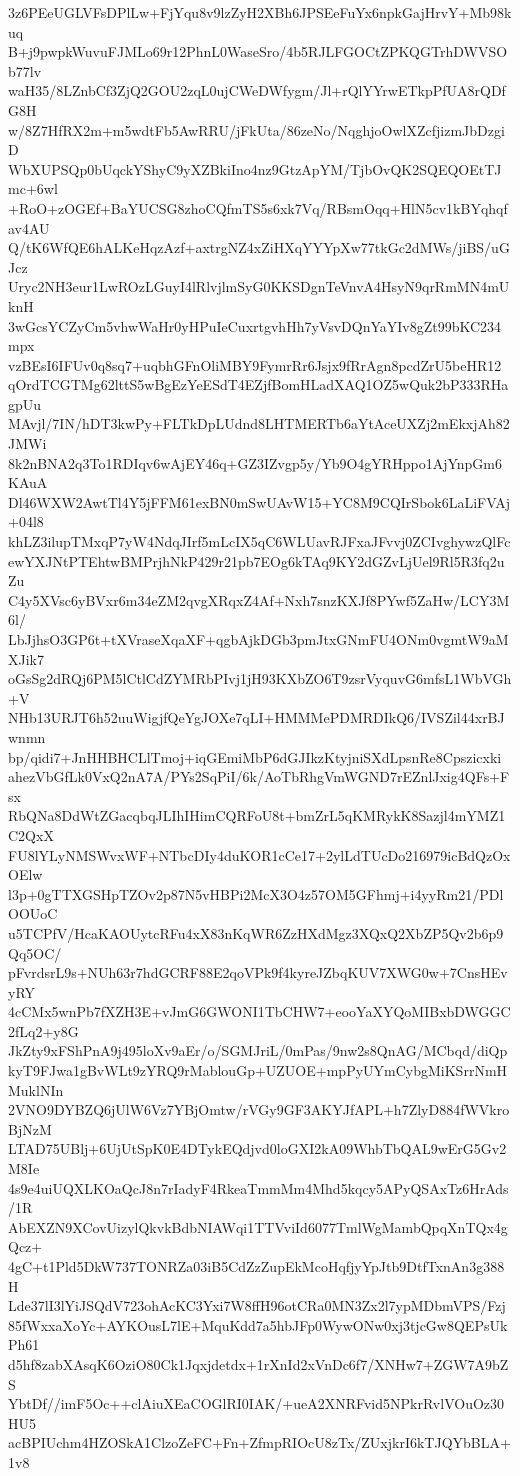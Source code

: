 3z6PEeUGLVFsDPlLw+FjYqu8v9lzZyH2XBh6JPSEeFuYx6npkGajHrvY+Mb98kuq
B+j9pwpkWuvuFJMLo69r12PhnL0WaseSro/4b5RJLFGOCtZPKQGTrhDWVSOb77lv
waH35/8LZnbCf3ZjQ2GOU2zqL0ujCWeDWfygm/Jl+rQlYYrwETkpPfUA8rQDfG8H
w/8Z7HfRX2m+m5wdtFb5AwRRU/jFkUta/86zeNo/NqghjoOwlXZcfjizmJbDzgiD
WbXUPSQp0bUqckYShyC9yXZBkiIno4nz9GtzApYM/TjbOvQK2SQEQOEtTJmc+6wl
+RoO+zOGEf+BaYUCSG8zhoCQfmTS5s6xk7Vq/RBsmOqq+HlN5cv1kBYqhqfav4AU
Q/tK6WfQE6hALKeHqzAzf+axtrgNZ4xZiHXqYYYpXw77tkGc2dMWs/jiBS/uGJcz
Uryc2NH3eur1LwROzLGuyI4lRlvjlmSyG0KKSDgnTeVnvA4HsyN9qrRmMN4mUknH
3wGcsYCZyCm5vhwWaHr0yHPuIeCuxrtgvhHh7yVsvDQnYaYIv8gZt99bKC234mpx
vzBEsI6IFUv0q8sq7+uqbhGFnOliMBY9FymrRr6Jsjx9fRrAgn8pcdZrU5beHR12
qOrdTCGTMg62lttS5wBgEzYeESdT4EZjfBomHLadXAQ1OZ5wQuk2bP333RHagpUu
MAvjl/7IN/hDT3kwPy+FLTkDpLUdnd8LHTMERTb6aYtAceUXZj2mEkxjAh82JMWi
8k2nBNA2q3To1RDIqv6wAjEY46q+GZ3IZvgp5y/Yb9O4gYRHppo1AjYnpGm6KAuA
Dl46WXW2AwtTl4Y5jFFM61exBN0mSwUAvW15+YC8M9CQIrSbok6LaLiFVAj+04l8
khLZ3ilupTMxqP7yW4NdqJIrf5mLcIX5qC6WLUavRJFxaJFvvj0ZCIvghywzQlFc
ewYXJNtPTEhtwBMPrjhNkP429r21pb7EOg6kTAq9KY2dGZvLjUel9Rl5R3fq2uZu
C4y5XVsc6yBVxr6m34eZM2qvgXRqxZ4Af+Nxh7snzKXJf8PYwf5ZaHw/LCY3M6l/
LbJjhsO3GP6t+tXVraseXqaXF+qgbAjkDGb3pmJtxGNmFU4ONm0vgmtW9aMXJik7
oGsSg2dRQj6PM5lCtlCdZYMRbPIvj1jH93KXbZO6T9zsrVyquvG6mfsL1WbVGh+V
NHb13URJT6h52uuWigjfQeYgJOXe7qLI+HMMMePDMRDIkQ6/IVSZil44xrBJwnmn
bp/qidi7+JnHHBHCLlTmoj+iqGEmiMbP6dGJIkzKtyjniSXdLpsnRe8Cpszicxki
ahezVbGfLk0VxQ2nA7A/PYs2SqPiI/6k/AoTbRhgVmWGND7rEZnlJxig4QFs+Fsx
RbQNa8DdWtZGacqbqJLIhIHimCQRFoU8t+bmZrL5qKMRykK8Sazjl4mYMZ1C2QxX
FU8lYLyNMSWvxWF+NTbcDIy4duKOR1cCe17+2ylLdTUcDo216979icBdQzOxOElw
l3p+0gTTXGSHpTZOv2p87N5vHBPi2McX3O4z57OM5GFhmj+i4yyRm21/PDlOOUoC
u5TCPfV/HcaKAOUytcRFu4xX83nKqWR6ZzHXdMgz3XQxQ2XbZP5Qv2b6p9Qq5OC/
pFvrdsrL9s+NUh63r7hdGCRF88E2qoVPk9f4kyreJZbqKUV7XWG0w+7CnsHEvyRY
4cCMx5wnPb7fXZH3E+vJmG6GWONI1TbCHW7+eooYaXYQoMIBxbDWGGC2fLq2+y8G
JkZty9xFShPnA9j495loXv9aEr/o/SGMJriL/0mPas/9nw2s8QnAG/MCbqd/diQp
kyT9FJwa1gBvWLt9zYRQ9rMablouGp+UZUOE+mpPyUYmCybgMiKSrrNmHMuklNIn
2VNO9DYBZQ6jUlW6Vz7YBjOmtw/rVGy9GF3AKYJfAPL+h7ZlyD884fWVkroBjNzM
LTAD75UBlj+6UjUtSpK0E4DTykEQdjvd0loGXI2kA09WhbTbQAL9wErG5Gv2M8Ie
4s9e4uiUQXLKOaQcJ8n7rIadyF4RkeaTmmMm4Mhd5kqcy5APyQSAxTz6HrAds/1R
AbEXZN9XCovUizylQkvkBdbNIAWqi1TTVviId6077TmlWgMambQpqXnTQx4gQcz+
4gC+t1Pld5DkW737TONRZa03iB5CdZzZupEkMcoHqfjyYpJtb9DtfTxnAn3g388H
Lde37lI3lYiJSQdV723ohAcKC3Yxi7W8ffH96otCRa0MN3Zx2l7ypMDbmVPS/Fzj
85fWxxaXoYc+AYKOusL7lE+MquKdd7a5hbJFp0WywONw0xj3tjcGw8QEPsUkPh61
d5hf8zabXAsqK6OziO80Ck1Jqxjdetdx+1rXnId2xVnDc6f7/XNHw7+ZGW7A9bZS
YbtDf//imF5Oc++clAiuXEaCOGlRI0IAK/+ueA2XNRFvid5NPkrRvlVOuOz30HU5
acBPIUchm4HZOSkA1ClzoZeFC+Fn+ZfmpRIOcU8zTx/ZUxjkrI6kTJQYbBLA+1v8
